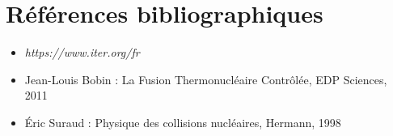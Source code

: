 \documentclass{article}
\begin{document}
\section*{Références bibliographiques}

\begin{itemize}
    \item[\textbf{[1]}] \textit{https://www.iter.org/fr}
    \item[\textbf{[2]}] Jean-Louis Bobin : La Fusion Thermonucléaire Contrôlée, EDP Sciences, 2011
    \item[\textbf{[3]}] Éric Suraud : Physique des collisions nucléaires, Hermann, 1998
\end{itemize}
\end{document}
